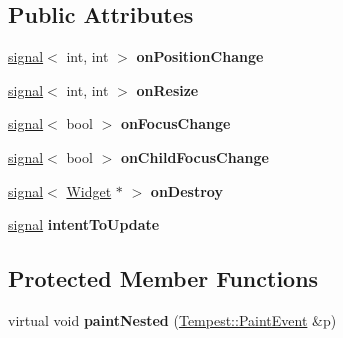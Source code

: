 \subsection*{Public Attributes}
\begin{DoxyCompactItemize}
\item 
\hypertarget{class_tempest_1_1_widget_a411b11aabcbca248880392bd4af40304}{\hyperlink{class_tempest_1_1signal}{signal}$<$ int, int $>$ {\bfseries on\+Position\+Change}}\label{class_tempest_1_1_widget_a411b11aabcbca248880392bd4af40304}

\item 
\hypertarget{class_tempest_1_1_widget_a47c20221ef389d5b650749bdf9bd00d5}{\hyperlink{class_tempest_1_1signal}{signal}$<$ int, int $>$ {\bfseries on\+Resize}}\label{class_tempest_1_1_widget_a47c20221ef389d5b650749bdf9bd00d5}

\item 
\hypertarget{class_tempest_1_1_widget_af005a4fea6fd755807246d0b15c4ec05}{\hyperlink{class_tempest_1_1signal}{signal}$<$ bool $>$ {\bfseries on\+Focus\+Change}}\label{class_tempest_1_1_widget_af005a4fea6fd755807246d0b15c4ec05}

\item 
\hypertarget{class_tempest_1_1_widget_aef6a8296cac57a5d543be53a628c12a5}{\hyperlink{class_tempest_1_1signal}{signal}$<$ bool $>$ {\bfseries on\+Child\+Focus\+Change}}\label{class_tempest_1_1_widget_aef6a8296cac57a5d543be53a628c12a5}

\item 
\hypertarget{class_tempest_1_1_widget_af799ef22f77598361cb387172234e21e}{\hyperlink{class_tempest_1_1signal}{signal}$<$ \hyperlink{class_tempest_1_1_widget}{Widget} $\ast$ $>$ {\bfseries on\+Destroy}}\label{class_tempest_1_1_widget_af799ef22f77598361cb387172234e21e}

\item 
\hypertarget{class_tempest_1_1_widget_a5632936c04c0366368febc03f7ca8531}{\hyperlink{class_tempest_1_1signal}{signal} {\bfseries intent\+To\+Update}}\label{class_tempest_1_1_widget_a5632936c04c0366368febc03f7ca8531}

\end{DoxyCompactItemize}
\subsection*{Protected Member Functions}
\begin{DoxyCompactItemize}
\item 
\hypertarget{class_tempest_1_1_widget_a0c08befc43fdbdc2568b8a92e3e59eab}{virtual void {\bfseries paint\+Nested} (\hyperlink{class_tempest_1_1_paint_event}{Tempest\+::\+Paint\+Event} \&p)}\label{class_tempest_1_1_widget_a0c08befc43fdbdc2568b8a92e3e59eab}

\end{DoxyCompactItemize}
